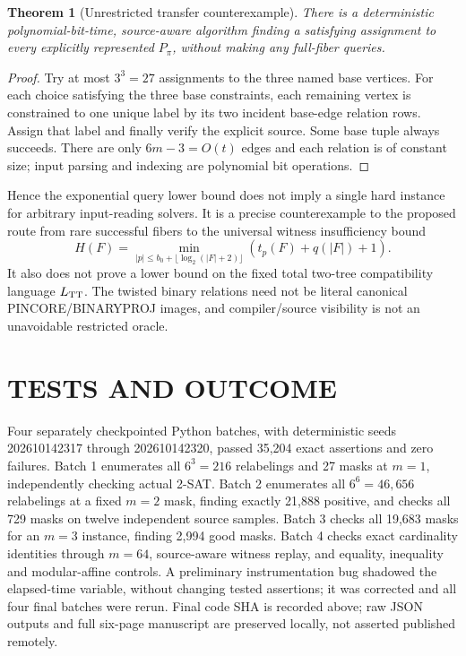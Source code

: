 \documentclass[11pt]{article}
\newtheorem{theorem}{Theorem}
\begin{document}
\begin{theorem}[Unrestricted transfer counterexample]
There is a deterministic polynomial-bit-time, source-aware algorithm finding a satisfying assignment to \emph{every} explicitly represented $P_\pi$, without making any full-fiber queries.
\end{theorem}
\begin{proof}
Try at most $3^3=27$ assignments to the three named base vertices. For each choice satisfying the three base constraints, each remaining vertex is constrained to one unique label by its two incident base-edge relation rows. Assign that label and finally verify the explicit source. Some base tuple always succeeds. There are only $6m-3=O(t)$ edges and each relation is of constant size; input parsing and indexing are polynomial bit operations.
\end{proof}

\noindent Hence the exponential query lower bound does not imply a single hard instance for arbitrary input-reading solvers. It is a precise counterexample to the proposed route from rare successful fibers to the universal witness insufficiency bound
\[
H(F)=\min_{|p|\le b_0+\lfloor\log_2(|F|+2)\rfloor}(t_p(F)+q(|F|)+1).
\]
It also does not prove a lower bound on the fixed total two-tree compatibility language $L_{\rm TT}$. The twisted binary relations need not be literal canonical PINCORE/BINARYPROJ images, and compiler/source visibility is not an unavoidable restricted oracle.

\section{TESTS AND OUTCOME}
Four separately checkpointed Python batches, with deterministic seeds 202610142317 through 202610142320, passed 35,204 exact assertions and zero failures. Batch 1 enumerates all $6^3=216$ relabelings and 27 masks at $m=1$, independently checking actual 2-SAT. Batch 2 enumerates all $6^6=46,656$ relabelings at a fixed $m=2$ mask, finding exactly 21,888 positive, and checks all 729 masks on twelve independent source samples. Batch 3 checks all 19,683 masks for an $m=3$ instance, finding 2,994 good masks. Batch 4 checks exact cardinality identities through $m=64$, source-aware witness replay, and equality, inequality and modular-affine controls. A preliminary instrumentation bug shadowed the elapsed-time variable, without changing tested assertions; it was corrected and all four final batches were rerun. Final code SHA is recorded above; raw JSON outputs and full six-page manuscript are preserved locally, not asserted published remotely.
\end{document}
